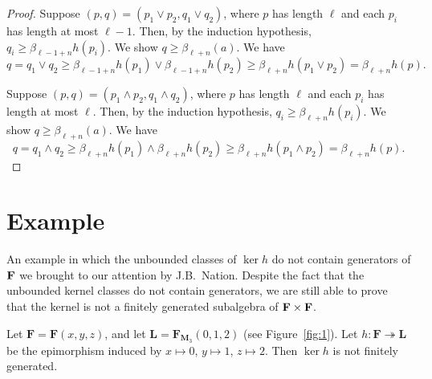 \begin{proof}
\bigskip

\bigskip

Suppose $(p, q) = (p_1\vee p_2, q_1 \vee q_2)$, 
where $p$ has length $\ell$ and each $p_i$ has length at most $\ell-1$.
Then, by the induction hypothesis, $q_i \geq \beta_{\ell-1 + n}h(p_i)$.
We show $q\geq \beta_{\ell+n}(a)$.
We have 
\[
q = q_1 \vee q_2 \geq \beta_{\ell-1+n}h(p_1) \vee \beta_{\ell-1+n}h(p_2) \geq 
\beta_{\ell+n}h(p_1\vee p_2) =
\beta_{\ell+n}h(p).
\]

Suppose $(p, q) = (p_1\wedge p_2, q_1 \wedge q_2)$, where $p$ has length $\ell$ 
and each $p_i$ has length at most $\ell$.
Then, by the induction hypothesis, $q_i \geq \beta_{\ell+ n}h(p_i)$.
We show $q\geq \beta_{\ell+n}(a)$.
We have 
\[
q = q_1 \wedge q_2 \geq \beta_{\ell+n}h(p_1) \wedge \beta_{\ell+n}h(p_2) \geq 
\beta_{\ell+n}h(p_1\wedge p_2) =
\beta_{\ell+n}h(p).
\]

\end{proof}

\bigskip

\bigskip




\section{Example}
An example in which the unbounded
classes of $\ker h$ do not contain generators of $\mathbf{F}$ we brought to our attention by J.B.~Nation.  Despite the fact that the unbounded kernel classes do not contain generators, we are still able to prove that the kernel is not a finitely generated subalgebra of $\mathbf{F} \times \mathbf{F}$.
\begin{proposition}
  \label{prop:2.2}
Let $\mathbf{F} = \mathbf{F}(x,y,z)$, and let $\mathbf{L} = \mathbf{F}_{\mathbf{M}_3}(0,1,2)$ (see Figure~\ref{fig:1}).  
Let $h\colon \mathbf{F} \twoheadrightarrow \mathbf{L}$ be the epimorphism induced by $x\mapsto 0$, $y\mapsto 1$, $z\mapsto 2$. Then $\operatorname{ker}h$ is not finitely generated.  
\end{proposition}

